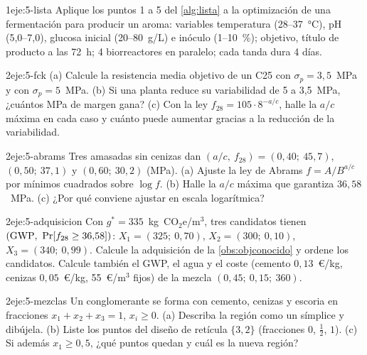 \begin{ejercicio}{1}{eje:5-lista}
Aplique los puntos 1 a 5 del \cref{alg:lista} a la optimización de una fermentación para producir un aroma: variables temperatura (28–37~°C), pH (5,0–7,0), glucosa inicial (20–80~g/L) e inóculo (1–10~\%); objetivo, título de producto a las 72~h; 4 biorreactores en paralelo; cada tanda dura 4 días.
\end{ejercicio}

\begin{ejercicio}{2}{eje:5-fck}
(a) Calcule la resistencia media objetivo de un C25 con $\sigma_p=3{,}5$~MPa y con $\sigma_p=5$~MPa. (b) Si una planta reduce su variabilidad de 5 a 3,5~MPa, ¿cuántos MPa de margen gana? (c) Con la ley $f_{28}=105\cdot8^{-a/c}$, halle la $a/c$ máxima en cada caso y cuánto puede aumentar gracias a la reducción de la variabilidad.
\end{ejercicio}

\begin{ejercicio}{2}{eje:5-abrams}
Tres amasadas sin cenizas dan $(a/c,\ f_{28})=(0{,}40;\ 45{,}7)$, $(0{,}50;\ 37{,}1)$ y $(0{,}60;\ 30{,}2)$ (MPa). (a) Ajuste la ley de Abrams $f=A/B^{a/c}$ por mínimos cuadrados sobre $\log f$. (b) Halle la $a/c$ máxima que garantiza $36{,}58$~MPa. (c) ¿Por qué conviene ajustar en escala logarítmica?
\end{ejercicio}

\begin{ejercicio}{2}{eje:5-adquisicion}
Con $g^*=335$~kg~CO$_2$e/m$^3$, tres candidatos tienen $(\gwp,\ \Pr[f_{28}\ge36{,}58])$: $X_1=(325;\ 0{,}70)$, $X_2=(300;\ 0{,}10)$, $X_3=(340;\ 0{,}99)$. Calcule la adquisición de la \cref{obs:objconocido} y ordene los candidatos. Calcule también el GWP, el agua y el coste (cemento $0{,}13$~€/kg, cenizas $0{,}05$~€/kg, 55~€/m$^3$ fijos) de la mezcla $(0{,}45;\ 0{,}15;\ 360)$.
\end{ejercicio}

\begin{ejercicio}{2}{eje:5-mezclas}
Un conglomerante se forma con cemento, cenizas y escoria en fracciones $x_1+x_2+x_3=1$, $x_i\ge0$. (a) Describa la región como un símplice y dibújela. (b) Liste los puntos del diseño de retícula $\{3,2\}$ (fracciones $0$, $\tfrac12$, $1$). (c) Si además $x_1\ge0{,}5$, ¿qué puntos quedan y cuál es la nueva región?
\end{ejercicio}

